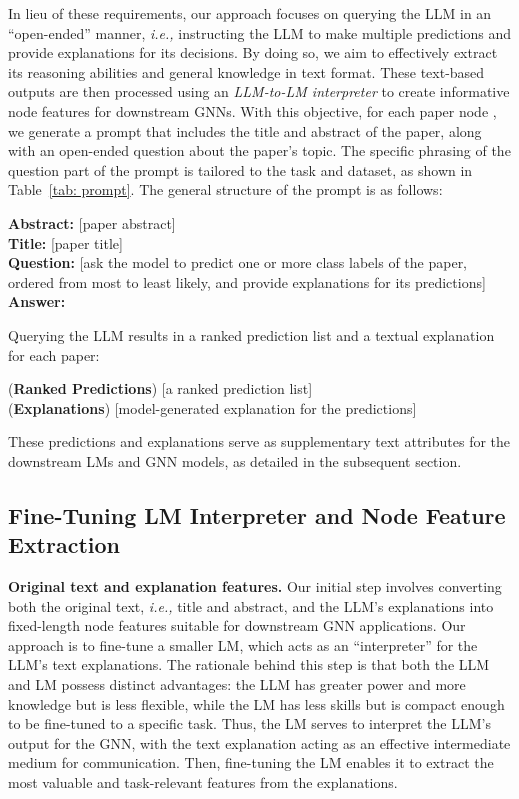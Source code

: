 \documentclass{article}
\newcommand{\ie}{\emph{i.e.,}\xspace}
\begin{document}
In lieu of these requirements, our approach focuses on querying the LLM in an ``open-ended'' manner, \ie instructing the LLM to make multiple predictions and provide explanations for its decisions. By doing so, we aim to effectively extract its reasoning abilities and general knowledge in text format. These text-based outputs are then processed using an \emph{LLM-to-LM interpreter} to create informative node features for downstream GNNs. With this objective, for each paper node , we generate a prompt that includes the title and abstract of the paper, along with an open-ended question about the paper's topic. The specific phrasing of the question part of the prompt is tailored to the task and dataset, as shown in Table~\ref{tab: prompt}. The general structure of the prompt is as follows:
\begin{tcolorbox}\textbf{Abstract:} [paper abstract]\\
\textbf{Title:} [paper title]\\
\textbf{Question:} [ask the model to predict one or more class labels of the paper, ordered from most to least likely, and provide explanations for its predictions]\\
\textbf{Answer:}
\end{tcolorbox}

Querying the LLM results in a ranked prediction list and a textual explanation for each paper:
\begin{tcolorbox}(\textbf{Ranked Predictions}) [a ranked prediction list]\\
(\textbf{Explanations}) [model-generated explanation for the predictions]
\end{tcolorbox}
These predictions and explanations serve as supplementary text attributes for the downstream LMs and GNN models, as detailed in the subsequent section.


\subsection{Fine-Tuning LM Interpreter and Node Feature Extraction}

\textbf{Original text and explanation features.} 
Our initial step involves converting both the original text, \ie title and abstract, and the LLM's explanations into fixed-length node features suitable for downstream GNN applications. Our approach is to fine-tune a smaller LM, which acts as an ``interpreter'' for the LLM's text explanations. The rationale behind this step is that both the LLM and LM possess distinct advantages: the LLM has greater power and more knowledge but is less flexible, while the LM has less skills but is compact enough to be fine-tuned to a specific task. Thus, the LM serves to interpret the LLM's output for the GNN, with the text explanation acting as an effective intermediate medium for communication. Then, fine-tuning the LM enables it to extract the most valuable and task-relevant features from the explanations. 
\end{document}
